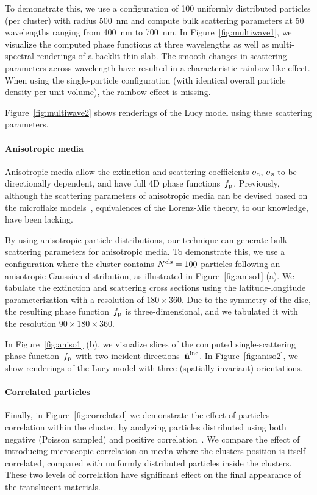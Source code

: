 To demonstrate this, we use a configuration of 100 uniformly distributed particles (per cluster) with radius 500~nm and compute bulk scattering parameters at 50 wavelengths ranging from 400~nm to 700~nm.
In Figure~\ref{fig:multiwave1}, we visualize the computed phase functions at three wavelengths as well as multi-spectral renderings of a backlit thin slab.
The smooth changes in scattering parameters across wavelength have resulted in a characteristic rainbow-like effect.
When using the single-particle configuration (with identical overall particle density per unit volume), the rainbow effect is missing.

Figure~\ref{fig:multiwave2} shows renderings of the Lucy model using these scattering parameters.

\paragraph{Anisotropic media}
Anisotropic media allow the extinction and scattering coefficients $\sigma_\mathrm{t}$, $\sigma_\mathrm{s}$ to be directionally dependent, and have full 4D phase functions~$f_\mathrm{p}$.
Previously, although the scattering parameters of anisotropic media can be devised based on the microflake models~\cite{jakob2010radiative,heitz2015sggx}, equivalences of the Lorenz-Mie theory, to our knowledge, have been lacking. 

By using anisotropic particle distributions, our technique can generate bulk scattering parameters for anisotropic media.
To demonstrate this, we use a configuration where the cluster contains ${N^\text{cls}} = 100$ particles following an anisotropic Gaussian distribution, as illustrated in Figure~\ref{fig:aniso1} (a).
We tabulate the extinction and scattering cross sections using the latitude-longitude parameterization with a resolution of $180 \times 360$.
Due to the symmetry of the disc, the resulting phase function~$f_\mathrm{p}$ is three-dimensional, and we tabulated it with the resolution $90 \times 180 \times360$.

In Figure~\ref{fig:aniso1} (b), we visualize slices of the computed single-scattering phase function~$f_\mathrm{p}$ with two incident directions~$\mathbf{\hat{n}}^{\text{inc}}$.
In Figure~\ref{fig:aniso2}, we show renderings of the Lucy model with three (spatially invariant) orientations.

\paragraph{Correlated particles}
Finally, in Figure~\ref{fig:correlated} we demonstrate the effect of particles correlation within the cluster, by analyzing particles distributed using both negative (Poisson sampled) and positive correlation~\cite{jarabo2018radiative}. We compare the effect of introducing microscopic correlation on media where the clusters position is itself correlated, compared with uniformly distributed particles inside the clusters. These two levels of correlation have significant effect on the final appearance of the translucent materials. 



%